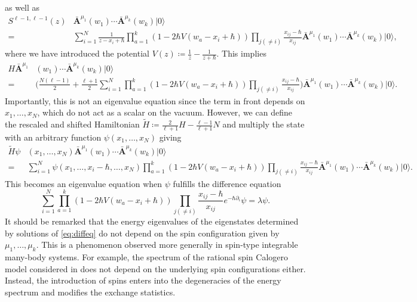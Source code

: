 as well as
\begin{equation}
\begin{aligned}
S^{\ell-1,\ell-1}(z) & \bar{\mathbf{A}}^{\mu_1}(w_1) \cdots \bar{\mathbf{A}}^{\mu_k}(w_k) |0\rangle \\
={}& \sum_{i=1}^N \frac{1}{z-x_i+\hbar} \prod_{a=1}^k (1-2\hbar V(w_a-x_i+\hbar)) \prod_{j(\neq i)} \frac{x_{ij}-\hbar}{x_{ij}} \bar{\mathbf{A}}^{\mu_1}(w_1) \cdots \bar{\mathbf{A}}^{\mu_k}(w_k) |0\rangle,
\end{aligned}
\end{equation}
where we have introduced the potential $V(z) \coloneq \frac{1}{z}-\frac{1}{z+\hbar}$. This implies
\begin{equation}
\begin{aligned}
H \bar{\mathbf{A}}^{\mu_1}&(w_1) \cdots \bar{\mathbf{A}}^{\mu_k}(w_k) |0\rangle \\
={}& \bigg( \frac{N(\ell-1)}{2} + \frac{\ell+1}{2} \sum_{i=1}^N \prod_{a=1}^k (1-2\hbar V(w_a-x_i+\hbar)) \prod_{j(\neq i)} \frac{x_{ij}-\hbar}{x_{ij}} \bigg) \bar{\mathbf{A}}^{\mu_1}(w_1) \cdots \bar{\mathbf{A}}^{\mu_k}(w_k) |0\rangle.
\end{aligned}
\end{equation}
Importantly, this is not an eigenvalue equation since the term in front depends on $x_1,\dots,x_N$, which do not act as a scalar on the vacuum. However, we can define the rescaled and shifted Hamiltonian $\tilde H \coloneq \frac{2}{\ell+1} H - \frac{\ell-1}{\ell+1} N$ and multiply the state with an arbitrary function $\psi(x_1,\dots,x_N)$ giving
\begin{equation}
\begin{aligned}
\tilde H \psi&(x_1,\dots,x_N) \bar{\mathbf{A}}^{\mu_1}(w_1) \cdots \bar{\mathbf{A}}^{\mu_k}(w_k) |0\rangle \\
={}& \sum_{i=1}^N \psi(x_1,\dots,x_i-\hbar,\dots,x_N) \prod_{a=1}^k (1-2\hbar V(w_a-x_i+\hbar)) \prod_{j(\neq i)} \frac{x_{ij}-\hbar}{x_{ij}} \bar{\mathbf{A}}^{\mu_1}(w_1) \cdots \bar{\mathbf{A}}^{\mu_k}(w_k) |0\rangle.
\end{aligned}
\end{equation}
This becomes an eigenvalue equation when $\psi$ fulfills the difference equation
\begin{equation} \label{eq:diffeq}
\sum_{i=1}^N \prod_{a=1}^k (1-2\hbar V(w_a-x_i+\hbar)) \prod_{j(\neq i)} \frac{x_{ij}-\hbar}{x_{ij}} e^{-\hbar\partial_i} \psi = \lambda \psi.
\end{equation}
It should be remarked that the energy eigenvalues of the eigenstates determined by solutions of \eqref{eq:diffeq} do not depend on the spin configuration given by $\mu_1,\dots,\mu_k$. This is a phenomenon observed more generally in spin-type integrable many-body systems. For example, the spectrum of the rational spin Calogero model considered in \cite{bourgine_calogero_2024} does not depend on the underlying spin configurations either. Instead, the introduction of spins enters into the degeneracies of the energy spectrum and modifies the exchange statistics.

